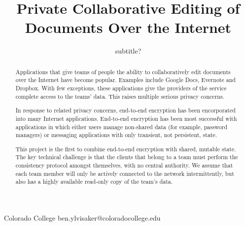 \documentclass[pldi,10pt,preprint]{sigplanconf-pldi16}
\begin{document}
\newcommand{\LoginSalt}[1]{{$\textrm{LoginSalt}_{#1}$}}
\newcommand{\subscr}[2]{{$\textrm{#1}_{#2}$}}

\setlength{\pdfpageheight}{\paperheight}
\setlength{\pdfpagewidth}{\paperwidth}



\title{Private Collaborative Editing of Documents Over the Internet}
\subtitle{subtitle?}

           {Colorado College}
           {ben.ylvisaker@coloradocollege.edu}

\maketitle

\begin{abstract}

Applications that give teams of people the ability to collaboratively edit documents over the Internet have become popular.
Examples include Google Docs, Evernote and Dropbox.
With few exceptions, these applications give the providers of the service complete access to the teams' data.
This raises multiple serious privacy concerns.

In response to related privacy concerns, end-to-end encryption has been encorporated into many Internet applications.
End-to-end encryption has been most successful with applications in which either users manage non-shared data (for example, password managers) or messaging applications with only transient, not persistent, state.

This project is the first to combine end-to-end encryption with shared, mutable state.
The key technical challenge is that the clients that belong to a team must perform the consistency protocol amongst themselves, with no central authority.
We assume that each team member will only be actively connected to the network intermittently, but also has a highly available read-only copy of the team's data.

\end{abstract}
\end{document}
